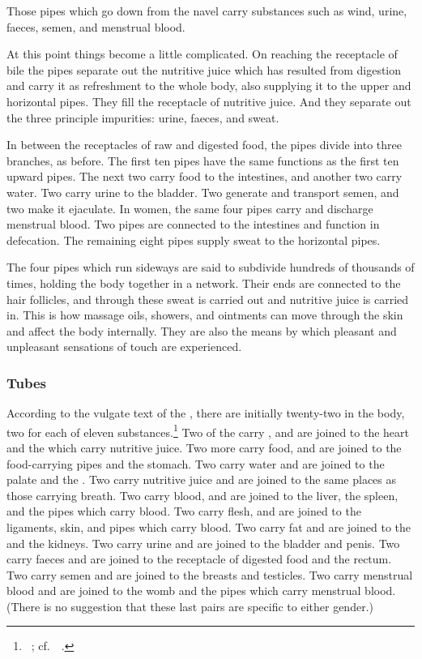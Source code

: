 Those pipes which go down from the navel carry substances such as
wind, urine, faeces, semen, and menstrual blood.

At this point things become a little complicated.  On reaching the
receptacle of bile the pipes separate out the nutritive juice which
has resulted from digestion and carry it as refreshment to the whole
body, also supplying it to the upper and horizontal pipes. They fill
the receptacle of nutritive juice. And they separate out the three
principle impurities: urine, faeces, and sweat.

In between the receptacles of raw and digested food, the pipes
divide into three branches, as before.  The first ten pipes
have the same functions as the first ten upward pipes. The
next two carry food to the intestines, and another two carry
water.  Two carry urine to the bladder.  Two generate and
transport semen, and two make it ejaculate.  In women, the
same four pipes carry and discharge menstrual blood.  Two
pipes are connected to the intestines and function in
defecation. The remaining eight pipes supply sweat to the
horizontal pipes.

The four pipes which run sideways are said to subdivide hundreds of
thousands of times, holding the body together in a network. Their ends
are connected to the hair follicles, and through these sweat is
carried out and nutritive juice is carried in.  This is how massage
oils, showers, and ointments can move through the skin and affect the
body internally.  They are also the means by which pleasant and
unpleasant sensations of touch are experienced.

\subsubsection{Tubes}

According to the vulgate text of the \SS, there are initially
twenty-two  in the body, two for each of eleven
substances.\footnote{\SS\ ; cf.\ \CS\
    .} Two of the  carry
    , and are joined to the heart and the
     which carry nutritive juice. Two more carry food,
    and are joined to the food-carrying pipes and the stomach. Two carry
    water and are joined to the palate and the \se{kloman}{lung}. Two
    carry nutritive juice and are joined to the same places as those
    carrying breath.  Two carry blood, and are joined to the liver, the
    spleen, and the pipes which carry blood. Two carry flesh, and are
    joined to the ligaments, skin, and pipes which carry blood. Two carry
    fat and are joined to the \se{kaṭī}{waist} and the kidneys.  Two carry
    urine and are joined to the bladder and penis. Two carry faeces and
    are joined to the receptacle of digested food and the rectum. Two
    carry semen and are joined to the breasts and testicles. Two carry
    menstrual blood and are joined to the womb and the pipes which carry
    menstrual blood. (There is no suggestion that these last pairs are
    specific to either gender.)

